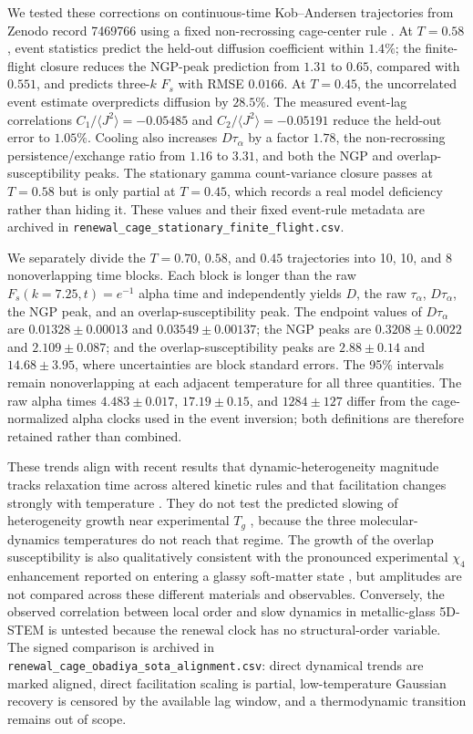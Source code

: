 \documentclass[aps,preprint,onecolumn,superscriptaddress,nofootinbib]{revtex4-2}
\begin{document}
We tested these corrections on continuous-time Kob--Andersen trajectories from
Zenodo record 7469766 using a fixed non-recrossing cage-center rule
\cite{obadiya2022fluid}.  At $T=0.58$, event statistics predict the held-out
diffusion coefficient within $1.4\%$; the finite-flight closure reduces the
NGP-peak prediction from $1.31$ to $0.65$, compared with $0.551$, and predicts
three-$k$ $F_s$ with RMSE $0.0166$.  At $T=0.45$, the uncorrelated event
estimate overpredicts diffusion by $28.5\%$.  The measured event-lag
correlations $C_1/\langle J^2\rangle=-0.05485$ and
$C_2/\langle J^2\rangle=-0.05191$ reduce the held-out error to $1.05\%$.
Cooling also increases $D\tau_\alpha$ by a factor $1.78$, the non-recrossing
persistence/exchange ratio from $1.16$ to $3.31$, and both the NGP and
overlap-susceptibility peaks.  The stationary gamma count-variance closure
passes at $T=0.58$ but is only partial at $T=0.45$, which records a real model
deficiency rather than hiding it.  These values and their fixed event-rule
metadata are archived in
\texttt{renewal\_cage\_stationary\_finite\_flight.csv}.

We separately divide the $T=0.70$, $0.58$, and $0.45$ trajectories into 10,
10, and 8 nonoverlapping time blocks.  Each block is longer than the raw
$F_s(k=7.25,t)=e^{-1}$ alpha time and independently yields $D$, the raw
$\tau_\alpha$, $D\tau_\alpha$, the NGP peak, and an overlap-susceptibility
peak.  The endpoint values of $D\tau_\alpha$ are
$0.01328\pm0.00013$ and $0.03549\pm0.00137$; the NGP peaks are
$0.3208\pm0.0022$ and $2.109\pm0.087$; and the overlap-susceptibility peaks
are $2.88\pm0.14$ and $14.68\pm3.95$, where uncertainties are block standard
errors.  The 95\% intervals remain nonoverlapping at each adjacent temperature
for all three quantities.  The raw alpha times
$4.483\pm0.017$, $17.19\pm0.15$, and $1284\pm127$ differ from the
cage-normalized alpha clocks used in the event inversion; both definitions are
therefore retained rather than combined.

These trends align with recent results that dynamic-heterogeneity magnitude
tracks relaxation time across altered kinetic rules \cite{gavazzoni2024kinetic}
and that facilitation changes strongly with temperature
\cite{herrero2024facilitation}.  They do not test the predicted slowing of
heterogeneity growth near experimental $T_g$ \cite{berthier2024experimental},
because the three molecular-dynamics temperatures do not reach that regime.
The growth of the overlap susceptibility is also qualitatively consistent with
the pronounced experimental $\chi_4$ enhancement reported on entering a glassy
soft-matter state \cite{martinelli2024lightscattering}, but amplitudes are not
compared across these different materials and observables.  Conversely, the
observed correlation between local order and slow dynamics in metallic-glass
5D-STEM \cite{nakazawa2024structure} is untested because the renewal clock has
no structural-order variable.
The signed comparison is archived in
\texttt{renewal\_cage\_obadiya\_sota\_alignment.csv}: direct dynamical trends
are marked aligned, direct facilitation scaling is partial, low-temperature
Gaussian recovery is censored by the available lag window, and a thermodynamic
transition remains out of scope.
\end{document}
